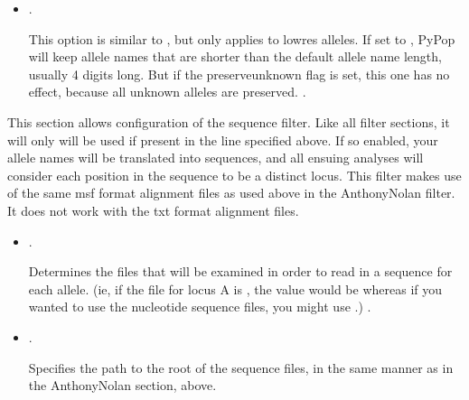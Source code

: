 \documentclass[letterpaper,10pt,english,openany,oneside]{sphinxmanual}
\begin{document}
\begin{itemize}
\item {} 
\sphinxAtStartPar
{}.

\sphinxAtStartPar
This option is similar to , but only applies to
lowres alleles. If set to , PyPop will keep allele names that are
shorter than the default allele name length, usually 4 digits long.
But if the preserve\sphinxhyphen{}unknown flag is set, this one has no effect,
because all unknown alleles are preserved. \sphinxstylestrong{{[}Default:}  \sphinxstylestrong{{]}}.

\end{itemize}

\sphinxAtStartPar
\sphinxcode{\sphinxupquote{{[}Sequence{]}}} 

\sphinxAtStartPar
This section allows configuration of the sequence filter. Like all
filter sections, it will only will be used if present in the
 line specified above. If so enabled, your allele
names will be translated into sequences, and all ensuing analyses will
consider each position in the sequence to be a distinct locus. This
filter makes use of the same msf format alignment files as used above in
the AnthonyNolan filter. It does not work with the txt format alignment
files.
\begin{itemize}
\item {} 
\sphinxAtStartPar
{}.

\sphinxAtStartPar
Determines the files that will be examined in order to read in a
sequence for each allele. (ie, if the file for locus A is
, the value would be  whereas if you
wanted to use the nucleotide sequence files, you might use
.) \sphinxstylestrong{{[}Default:}  \sphinxstylestrong{{]}}.

\item {} 
\sphinxAtStartPar
{}.

\sphinxAtStartPar
Specifies the path to the root of the sequence files, in the same
manner as in the AnthonyNolan section, above.

\end{itemize}

\sphinxAtStartPar
\sphinxcode{\sphinxupquote{{[}DigitBinning{]}}} 
\end{document}
